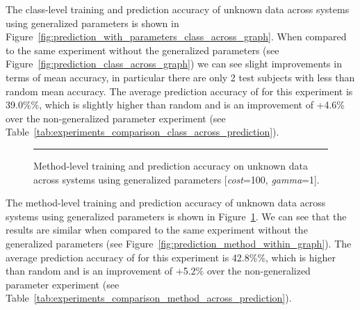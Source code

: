 The class-level training and prediction accuracy of unknown data across systems using generalized parameters is shown in Figure~\ref{fig:prediction_with_parameters_class_across_graph}. When compared to the same experiment without the generalized parameters (see Figure~\ref{fig:prediction_class_across_graph}) we can see slight improvements in terms of mean accuracy, in particular there are only 2 test subjects with less than random mean accuracy. The average prediction accuracy of for this experiment is 39.0\%\%, which is slightly higher than random and is an improvement of +4.6\% over the non-generalized parameter experiment (see Table~\ref{tab:experiments_comparison_class_across_prediction}).

\begin{figure}[!tb]
  \centering
  \begin{adjustbox}{max size={\textwidth}{\textheight}}
    
  \end{adjustbox}
  \caption{Method-level training and prediction accuracy on unknown data across systems using generalized parameters [\emph{cost}=100, \emph{gamma}=1].}
  \vspace{2mm}
  \hrule
  \label{fig:prediction_with_parameters_method_across_graph}
\end{figure}

The method-level training and prediction accuracy of unknown data across systems using generalized parameters is shown in Figure~\ref{fig:prediction_with_parameters_method_across_graph}. We can see that the results are similar when compared to the same experiment without the generalized parameters (see Figure~\ref{fig:prediction_method_within_graph}). The average prediction accuracy of for this experiment is 42.8\%\%, which is higher than random and is an improvement of +5.2\% over the non-generalized parameter experiment (see Table~\ref{tab:experiments_comparison_method_across_prediction}).

